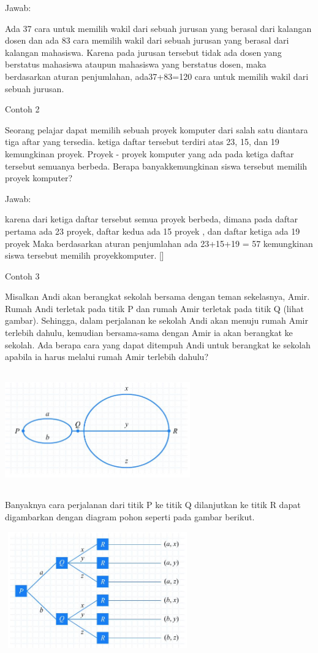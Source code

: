\documentclass[11pt,fleqn]{book} %
\begin{document}
Jawab:

Ada 37 cara untuk memilih wakil dari sebuah jurusan yang berasal dari kalangan dosen dan ada 83 cara memilih wakil dari sebuah jurusan yang berasal dari kalangan mahasiswa. Karena pada jurusan tersebut tidak ada dosen yang berstatus mahasiswa ataupun mahasiswa yang berstatus dosen, maka berdasarkan aturan penjumlahan, ada37+83=120 cara untuk memilih wakil dari sebuah jurusan. 

Contoh 2

Seorang pelajar dapat memilih sebuah proyek komputer dari salah satu diantara tiga aftar yang tersedia. ketiga daftar tersebut terdiri atas 23, 15, dan 19 kemungkinan proyek. Proyek - proyek komputer yang ada pada ketiga daftar tersebut semuanya berbeda. Berapa banyakkemungkinan siswa tersebut memilih proyek komputer?

Jawab: 

karena dari ketiga daftar tersebut semua proyek berbeda, dimana pada daftar pertama ada 23 proyek, daftar kedua ada 15 proyek , dan daftar ketiga ada 19 proyek Maka  berdasarkan aturan penjumlahan ada 23+15+19 = 57 kemungkinan siswa tersebut memilih proyekkomputer. []

Contoh 3

Misalkan Andi akan berangkat sekolah bersama dengan teman sekelasnya, Amir. Rumah Andi terletak pada titik P dan rumah Amir terletak pada titik Q (lihat gambar). Sehingga, dalam perjalanan ke sekolah Andi akan menuju rumah Amir terlebih dahulu, kemudian bersama-sama dengan Amir ia akan berangkat ke sekolah. Ada berapa cara yang dapat ditempuh Andi untuk berangkat ke sekolah apabila ia harus melalui rumah Amir terlebih dahulu?

 \includegraphics[width = 8cm, height= 5cm]{Pictures/contoh3.JPG}

Banyaknya cara perjalanan dari titik P ke titik Q dilanjutkan ke titik R dapat digambarkan dengan diagram pohon seperti pada gambar berikut.

 \includegraphics[width = 8cm, height= 5cm]{Pictures/contoh3a.JPG}
 
\end{document}
